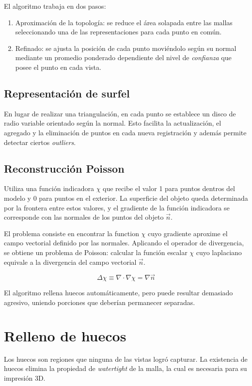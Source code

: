 		El algoritmo trabaja en dos pasos:
		\begin{enumerate}
			\item Aproximación de la topología: se reduce el área solapada
				entre las mallas seleccionando una de las representaciones para
				cada punto en común.
			\item Refinado: se ajusta la posición de cada punto moviéndolo
				según su normal mediante un promedio ponderado dependiente del
				nivel de \emph{confianza} que posee el punto en cada vista.\cite{Turk:1994:ZPM:192161.192241}
		\end{enumerate}

		\subsection{Representación de surfel}
		En lugar de realizar una triangulación, en cada punto se establece un disco de radio variable orientado según la normal.
		Esto facilita la actualización, el agregado y la eliminación de puntos en cada nueva registración y además permite detectar ciertos \emph{outliers}.\cite{5457479}

		\subsection{Reconstrucción Poisson}
		Utiliza una función indicadora $\chi$ que recibe el valor 1 para puntos
		dentros del modelo y 0 para puntos en el exterior.
		La superficie del objeto queda determinada por la frontera entre estos
		valores, y el gradiente de la función indicadora se corresponde con las
		normales de los puntos del objeto $\vec{n}$.

		El problema consiste en encontrar la function $\chi$ cuyo gradiente
		aproxime el campo vectorial definido por las normales. Aplicando el
		operador de divergencia, se obtiene un problema de Poisson: calcular la
		función escalar $\chi$ cuyo laplaciano equivale a la divergencia del
		campo vectorial $\vec{n}$.\cite{Kazhdan:2006:PSR:1281957.1281965}

		\[\Delta\chi \equiv \nabla \cdot\nabla\chi = \nabla \vec{n}\]

		El algoritmo rellena huecos automáticamente, pero puede resultar demasiado agresivo, uniendo porciones que deberían permanecer separadas.


	\section{Relleno de huecos}
		Los huecos son regiones que ninguna de las vistas logró capturar.
		La existencia de huecos elimina la propiedad de \emph{watertight} de la
		malla, la cual es necesaria para su impresión 3D.

